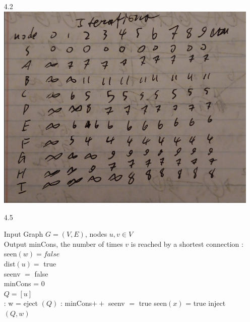 \documentclass[12pt, letterpaper]{article}
\begin{document}
\begin{enumerate}
	\item[4.2]\includegraphics[scale=0.9]{algosHW542png.png}
	\item[4.5]
	\begin{algorithmic}
	Input Graph $G = (V,E)$, nodes $u,v \in V$\\
	Output minCons, the number of times $v$ is reached by a shortest
	connection
	:
	\State seen$(w) = false$
	\EndFor\\
	
	dist$(u) =$ true\\
	seenv $=$ false\\
	minCons = 0\\
	$Q = [u]$\\
	:
	\State w = eject $(Q)$
	 :
	 \State minCons$++$
	 \State seenv $=$ true
	 \Else
	  \State seen$(x)$ = true
	 \EndIf
	 \State inject$(Q,w)$
	 \EndIf
	\EndIf
	\EndFor
	\EndWhile
	

\end{algorithmic}
\end{enumerate}
\end{document}
